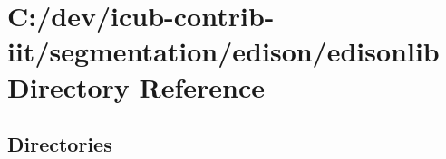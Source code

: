 \section{C\+:/dev/icub-\/contrib-\/iit/segmentation/edison/edisonlib Directory Reference}
\label{dir_e4f27251772675b4a85a1732d22dafa8}
\subsection*{Directories}
\begin{DoxyCompactItemize}
\end{DoxyCompactItemize}
